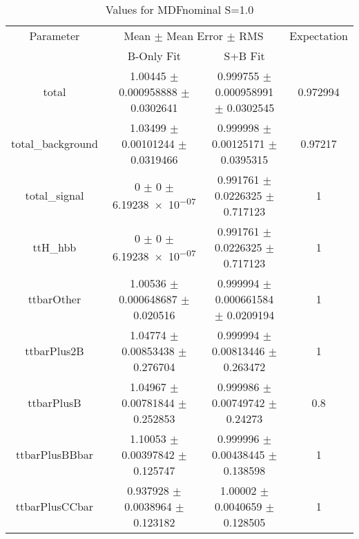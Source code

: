 \begin{table}
\centering
\caption{Values for MDFnominal S=1.0}
\begin{tabular}{cccc}
\toprule
Parameter & \multicolumn{2}{c}{Mean $\pm$ Mean Error $\pm$ RMS} & Expectation\\
 & B-Only Fit & S+B Fit & \\
\midrule
total & \num{1.00445} $\pm$ \num{0.000958888} $\pm$ \num{0.0302641} & \num{0.999755} $\pm$ \num{0.000958991} $\pm$ \num{0.0302545} & \num{0.972994}\\
total\_background & \num{1.03499} $\pm$ \num{0.00101244} $\pm$ \num{0.0319466} & \num{0.999998} $\pm$ \num{0.00125171} $\pm$ \num{0.0395315} & \num{0.97217}\\
total\_signal & \num{0} $\pm$ \num{0} $\pm$ \num{6.19238e-07} & \num{0.991761} $\pm$ \num{0.0226325} $\pm$ \num{0.717123} & \num{1}\\
ttH\_hbb & \num{0} $\pm$ \num{0} $\pm$ \num{6.19238e-07} & \num{0.991761} $\pm$ \num{0.0226325} $\pm$ \num{0.717123} & \num{1}\\
ttbarOther & \num{1.00536} $\pm$ \num{0.000648687} $\pm$ \num{0.020516} & \num{0.999994} $\pm$ \num{0.000661584} $\pm$ \num{0.0209194} & \num{1}\\
ttbarPlus2B & \num{1.04774} $\pm$ \num{0.00853438} $\pm$ \num{0.276704} & \num{0.999994} $\pm$ \num{0.00813446} $\pm$ \num{0.263472} & \num{1}\\
ttbarPlusB & \num{1.04967} $\pm$ \num{0.00781844} $\pm$ \num{0.252853} & \num{0.999986} $\pm$ \num{0.00749742} $\pm$ \num{0.24273} & \num{0.8}\\
ttbarPlusBBbar & \num{1.10053} $\pm$ \num{0.00397842} $\pm$ \num{0.125747} & \num{0.999996} $\pm$ \num{0.00438445} $\pm$ \num{0.138598} & \num{1}\\
ttbarPlusCCbar & \num{0.937928} $\pm$ \num{0.0038964} $\pm$ \num{0.123182} & \num{1.00002} $\pm$ \num{0.0040659} $\pm$ \num{0.128505} & \num{1}\\
\bottomrule
\end{tabular}
\end{table}
